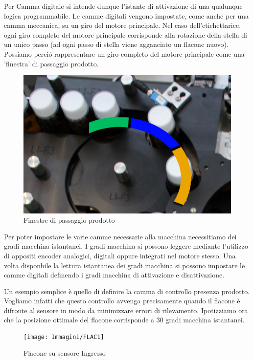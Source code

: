 \documentclass[12pt, a4paper, oneside]{book}
\begin{document}
Per Camma digitale si intende dunque l'istante di attivazione di una qualunque logica programmabile. Le camme digitali vengono impostate, come anche per una camma meccanica, su un giro del motore principale.
Nel caso dell'etichettarice, ogni giro completo del motore principale corrisponde alla rotazione della stella di un unico passo (ad ogni passo di stella viene agganciato un flacone nuovo).
Possiamo perciò rappresentare un giro completo del motore principale come una 'finestra' di passaggio prodotto.

\begin{figure}[H]
	\centering
	\includegraphics[width=12cm]{Immagini/FIN1}
	\caption{Finestre di passaggio prodotto}
	\label{FIN1}
\end{figure}

Per poter impostare le varie camme necessarie alla macchina necessitiamo dei gradi macchina istantanei. I gradi macchina si possono leggere mediante l'utilizzo di appositi encoder analogici, digitali oppure integrati nel motore stesso.
Una volta disponbile la lettura istantanea dei gradi macchina si possono impostare le camme digitali definendo i gradi macchina di attivazione e disattivazione. 

Un esempio semplice è quello di definire la camma di controllo presenza prodotto. Vogliamo infatti che questo controllo avvenga precisamente quando il flacone è difronte al sensore in modo da minimizzare errori di rilevamento.
Ipotizziamo ora che la posizione ottimale del flacone corrisponde a 30 gradi macchina istantanei. 

\begin{figure}[H]
	\centering
	\texttt{[image: Immagini/FLAC1]}
	\caption{ Flacone su sensore Ingresso}
	\label{FLAC1}
\end{figure}
\end{document}
